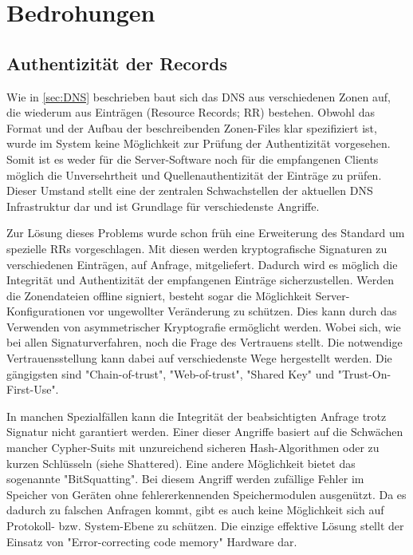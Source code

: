 \chapter{Bedrohungen}


\section{Authentizität der Records}
Wie in \ref{sec:DNS} beschrieben baut sich das DNS aus verschiedenen Zonen auf, die wiederum aus Einträgen (Resource Records; RR) bestehen. Obwohl das Format und der Aufbau der beschreibenden Zonen-Files klar spezifiziert ist, wurde im System keine Möglichkeit zur Prüfung der Authentizität vorgesehen. Somit ist es weder für die Server-Software noch für die empfangenen Clients möglich die Unversehrtheit und Quellenauthentizität der Einträge zu prüfen. Dieser Umstand stellt eine der zentralen Schwachstellen der aktuellen DNS Infrastruktur dar und ist Grundlage für verschiedenste Angriffe.

Zur Lösung dieses Problems wurde schon früh eine Erweiterung des Standard um spezielle RRs vorgeschlagen. Mit diesen werden kryptografische Signaturen zu verschiedenen Einträgen, auf Anfrage, mitgeliefert. Dadurch wird es möglich die Integrität und Authentizität der empfangenen Einträge sicherzustellen. Werden die Zonendateien offline signiert, besteht sogar die Möglichkeit Server-Konfigurationen vor ungewollter Veränderung zu schützen. Dies kann durch das Verwenden von asymmetrischer Kryptografie ermöglicht werden. Wobei sich, wie bei allen Signaturverfahren, noch die Frage des Vertrauens stellt. Die notwendige Vertrauensstellung kann dabei auf verschiedenste Wege hergestellt werden. Die gängigsten sind "Chain-of-trust", "Web-of-trust", "Shared Key" und "Trust-On-First-Use".

In manchen Spezialfällen kann die Integrität der beabsichtigten Anfrage trotz Signatur nicht garantiert werden. Einer dieser Angriffe basiert auf die Schwächen mancher Cypher-Suits mit unzureichend sicheren Hash-Algorithmen oder zu kurzen Schlüsseln (siehe Shattered). Eine andere Möglichkeit bietet das sogenannte "BitSquatting". Bei diesem Angriff werden zufällige Fehler im Speicher von Geräten ohne fehlererkennenden Speichermodulen ausgenützt. Da es dadurch zu falschen Anfragen kommt, gibt es auch keine Möglichkeit sich auf Protokoll- bzw. System-Ebene zu schützen. Die einzige effektive Lösung stellt der Einsatz von "Error-correcting code memory" Hardware dar.   

